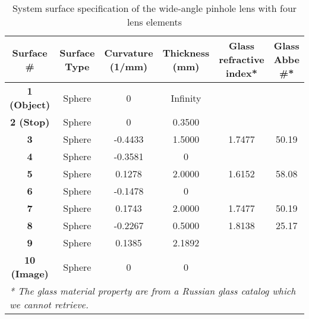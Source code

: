 \setlength{\arrayrulewidth}{.5mm}
\setlength{\tabcolsep}{18pt}
\renewcommand{\arraystretch}{1.2}
\begin{table}[h!]
    \centering
    \captionsetup{justification=centering}
    \caption{System surface specification of the wide-angle pinhole lens with four lens elements}
    \label{table: appdx_system_spec_wide_angle_4_lenses}
    \vspace{-1em}
    \begin{adjustbox}{max width=\textwidth, center}
    \begin{tabular}{c c c c c c}
    \hline 
     \textbf{Surface \#} & \textbf{Surface Type} & \textbf{Curvature (1/mm)} & \textbf{Thickness (mm)} & \textbf{Glass refractive index*} & \textbf{Glass Abbe \#*} \\ 
     \midrule
    \rowcolor[gray]{0.9}  \textbf{1 (Object)} & Sphere & 0 & Infinity &  &  \\ 
    										\textbf{2 (Stop)}   & Sphere & 0 & 0.3500       &  &  \\
   \rowcolor[gray]{0.9}    \textbf{3}               & Sphere & -0.4433 & 1.5000 & 1.7477 & 50.19\\
                                            \textbf{4}              & Sphere & -0.3581 & 0       &  & \\ 
    \rowcolor[gray]{0.9}   \textbf{5}              & Sphere & 0.1278  & 2.0000 & 1.6152 & 58.08 \\
                                           \textbf{6}               & Sphere & -0.1478 & 0       &  &\\
    \rowcolor[gray]{0.9}  \textbf{7}                & Sphere & 0.1743 & 2.0000 & 1.7477 &  50.19 \\ 
                                          \textbf{8}                & Sphere  & -0.2267& 0.5000 & 1.8138 & 25.17 \\
   \rowcolor[gray]{0.9}  \textbf{9}                & Sphere & 0.1385 &  2.1892 &   &   \\
                                         \textbf{10 (Image)} & Sphere & 0 & 0 &  &  \\ 
    \hline
    \multicolumn{6}{l}{\textit{\footnotesize{* The glass material property are from a Russian glass catalog which we cannot retrieve.}}}\\
    \end{tabular}
    \end{adjustbox}
\end{table}



